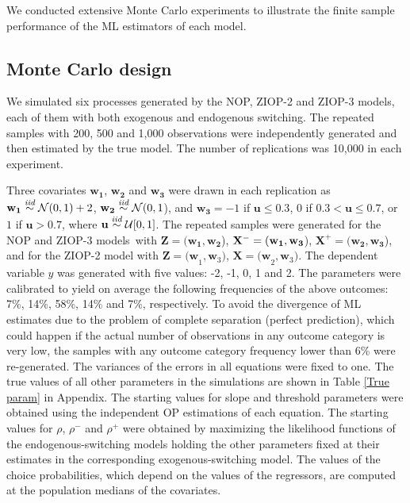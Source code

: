 \documentclass[letterpaper,fleqn,12pt]{article}
\begin{document}
We conducted extensive Monte Carlo experiments to illustrate the finite
sample performance of the ML estimators of each model.

\subsection{Monte Carlo design}

We simulated six processes generated by the NOP, ZIOP-2 and ZIOP-3 models,
each of them with both exogenous and endogenous switching. The repeated
samples with 200, 500 and 1,000 observations were independently generated
and then estimated by the true model. The number of replications was 10,000
in each experiment.

Three covariates $\mathbf{w}_{\mathbf{1}}$, $\mathbf{w}_{\mathbf{2}}$ and $%
\mathbf{w}_{\mathbf{3}}$ were drawn in each replication as\noindent\ $%
\mathbf{w}_{\mathbf{1}}\overset{\emph{iid}}{\sim }\mathcal{N}(0,1)+2$, $%
\mathbf{w}_{\mathbf{2}}\overset{\emph{iid}}{\sim }\mathcal{N}(0,1$), and $%
\mathbf{w}_{\mathbf{3}}=-1$ if $\mathbf{u}\leq 0.3$, $0$ if $0.3<\mathbf{u}%
\leq 0.7$, or $1$ if $\mathbf{u}>0.7$, where $\mathbf{u}\overset{\emph{iid}}{%
\sim }\mathcal{U}[0,1]$. The repeated samples were generated for the NOP and
ZIOP-3 models\textit{\ }with $\mathbf{Z=(w_{1}},\mathbf{w_{2}}$), $\mathbf{%
\mathbf{X}^{-}=(w_{1}},\mathbf{w_{3}}$), $\mathbf{\mathbf{X}^{+}=(w_{2}},%
\mathbf{w_{3}}$), and for the ZIOP-2 model with $\mathbf{Z=(w}_{1},\mathbf{w}%
_{3})$, $\mathbf{\mathbf{X}=(w}_{2},\mathbf{w}_{3})$. The dependent variable 
$y$ was generated with five values: -2, -1, 0, 1 and 2. The parameters were
calibrated to yield on average the following frequencies of the above
outcomes: 7\%, 14\%, 58\%, 14\% and 7\%, respectively. To avoid the
divergence of ML estimates due to the problem of complete separation
(perfect prediction), which could happen if the actual number of
observations in any outcome category is very low, the samples with any
outcome category frequency lower than 6\% were re-generated. The variances
of the errors in all equations were fixed to one. The true values of all
other parameters in the simulations are shown in Table \ref{True param} in
Appendix. The starting values for slope and threshold parameters were
obtained using the independent OP estimations of each equation. The starting
values for $\rho $, $\rho ^{-}$ and $\rho ^{+}$ were obtained by maximizing
the likelihood functions of the endogenous-switching models holding the
other parameters fixed at their estimates in the corresponding
exogenous-switching model. The values of the choice probabilities, which
depend on the values of the regressors, are computed at the population
medians of the covariates.
\end{document}
